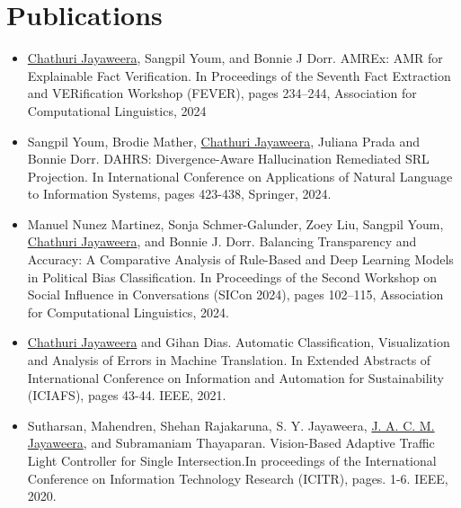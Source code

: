 \documentclass[a4paper,11pt]{article}
\begin{document}
\section{Publications}
\begin{itemize}
\setlength\itemsep{0.01em}
  \item \underline{Chathuri Jayaweera}, Sangpil Youm, and Bonnie J Dorr. AMREx: AMR for Explainable Fact Verification. In Proceedings of the Seventh Fact Extraction and VERification Workshop (FEVER), pages 234–244, Association for Computational Linguistics, 2024
  \item Sangpil Youm, Brodie Mather, \underline{Chathuri Jayaweera}, Juliana Prada and Bonnie Dorr. DAHRS: Divergence-Aware Hallucination Remediated SRL Projection. In International Conference on Applications of Natural Language to Information Systems, pages 423-438, Springer, 2024.
  \item Manuel Nunez Martinez, Sonja Schmer-Galunder, Zoey Liu, Sangpil Youm, \underline{Chathuri Jayaweera}, and Bonnie J. Dorr. Balancing Transparency and Accuracy: A Comparative Analysis of Rule-Based and Deep Learning Models in Political Bias Classification. In Proceedings of the Second Workshop on Social Influence in Conversations (SICon 2024), pages 102–115, Association for Computational Linguistics, 2024.
  \item \underline{Chathuri Jayaweera} and Gihan Dias. Automatic Classification, Visualization and Analysis of Errors in Machine Translation. In Extended Abstracts of International Conference on Information and Automation for Sustainability (ICIAFS), pages 43-44. IEEE, 2021.
  \item Sutharsan, Mahendren, Shehan Rajakaruna, S. Y. Jayaweera, \underline{J. A. C. M. Jayaweera}, and Subramaniam Thayaparan. Vision-Based Adaptive Traffic Light Controller for Single Intersection.In proceedings of the International Conference on Information Technology Research (ICITR), pages. 1-6. IEEE, 2020.
\end{itemize}

\vspace{-0.05in}
\end{document}

